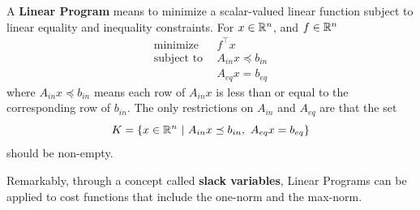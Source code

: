 \begin{definition} A \textbf{Linear Program} means to minimize a scalar-valued linear function subject to linear equality and inequality constraints. For $x \in \mathbb R^n$, and $f \in \mathbb R^n$
\begin{align*}
\text{minimize}& ~~ f^\top x\\
\text{subject to} &~~A_{in} x \preceq b_{in} \\
 & ~~A_{eq} x = b_{eq}
\end{align*}
where $A_{in} x \preceq b_{in}$ means each row of $A_{in}x$ is less than or equal to the corresponding row of $b_{in}$. The only restrictions on $A_{in}$ and $A_{eq}$ are that the set 
$$K=\{ x \in \mathbb R^n~|~ A_{in} x \preceq b_{in},~ A_{eq} x = b_{eq} \}$$
should be non-empty.
\end{definition}





Remarkably, through a concept called \textbf{slack variables}, Linear Programs can be applied to cost functions that include the one-norm and the max-norm.

